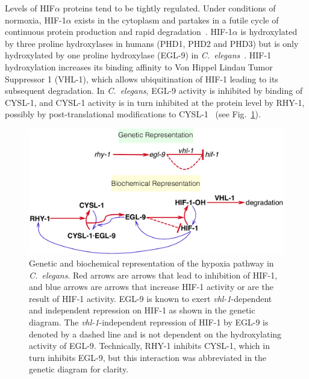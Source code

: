 \documentclass[9pt,twocolumn,twoside]{pnas-new}
\newcommand{\cel}{\emph{C.~elegans}}
\newcommand{\gene}[1]{\emph{#1}}
\newcommand{\eglp}{EGL-9}
\newcommand{\rhyp}{RHY-1}
\newcommand{\vhlp}{VHL-1}
\newcommand{\hifp}{HIF-1}
\newcommand{\cyslp}{CYSL-1}
\begin{document}
Levels of HIF$\alpha$ proteins tend to be tightly regulated. Under conditions of
normoxia, \hifp{}$\alpha$ exists in the cytoplasm and partakes in a futile cycle
of continuous protein production and rapid degradation~\cite{Huang1996}.
\hifp{}$\alpha$ is hydroxylated by three proline hydroxylases
in humans (PHD1, PHD2 and PHD3) but is only hydroxylated by one proline
hydroxylase (\eglp{}) in \cel{}~\cite{Kaelin2008}. \hifp{} hydroxylation
increases its binding affinity to Von Hippel Lindau Tumor Suppressor 1
(\vhlp{}), which allows ubiquitination of \hifp{} leading to its subsequent
degradation. In \cel{}, \eglp{} activity is inhibited by binding of \cyslp{},
and \cyslp{} activity is in turn inhibited at the protein level by \rhyp{},
possibly by post-translational modifications to \cyslp{}~\cite{Ma2012} (see
Fig.~\ref{fig:pathway}).

\begin{figure}[tbhp]
\centering
\includegraphics[width=\linewidth]{figs/HIF1pathway.pdf}
\caption{
Genetic and biochemical representation of the hypoxia pathway in \cel{}.
Red arrows are arrows that lead to inhibition of \hifp{}, and blue arrows
are arrows that increase \hifp{} activity or are the result of \hifp{} activity.
\eglp{} is known to exert \gene{vhl-1}-dependent and independent repression
on \hifp{} as shown in the genetic diagram. The \gene{vhl-1}-independent
repression of \hifp{} by \eglp{} is denoted by a dashed line and is not dependent
on the hydroxylating activity of \eglp{}.
Technically, RHY-1 inhibits CYSL-1, which in turn inhibits EGL-9, but this
interaction was abbreviated in the genetic diagram for clarity.
}
\label{fig:pathway}
\end{figure}
\end{document}
